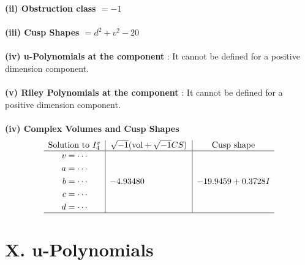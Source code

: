 \documentclass[1p]{elsarticle_modified}
\theoremstyle{definition}
\newcommand{\I}{\sqrt{-1}}
\begin{document}
\flushleft \textbf{(ii) Obstruction class $= -1$}\\~\\
\flushleft \textbf{(iii) Cusp Shapes $= d^2+v^2-20$}\\~\\
\flushleft \textbf{(iv) u-Polynomials at the component} : It cannot be defined for a positive dimension component.\\~\\
\flushleft \textbf{(v) Riley Polynomials at the component} : It cannot be defined for a positive dimension component.\\~\\
\newpage\flushleft \textbf{(iv) Complex Volumes and Cusp Shapes}
$$\begin{array}{c|c|c} 
\text{Solution to }I^v_{4}& \I (\text{vol} + \sqrt{-1}CS) & \text{Cusp shape}\\
 \hline 
\begin{aligned}
v &= \cdots \\
a &= \cdots \\
b &= \cdots \\
c &= \cdots \\
d &= \cdots\end{aligned}
 & -4.93480\phantom{ +0.000000I} & -19.9459 + 0.3728 I\\
 \hline 
 \end{array}
$$
\newpage\renewcommand{\arraystretch}{1}
\centering \section*{ X. u-Polynomials}
\end{document}
